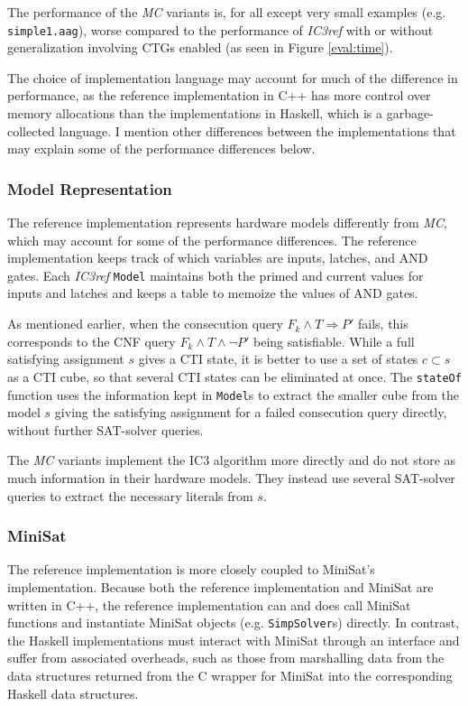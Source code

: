 \documentclass[12pt,a4paper,twoside,openright]{report}
\begin{document}
{{The performance of the \emph{MC} variants is, for all except very small examples
(e.g. \verb,simple1.aag,),
worse compared to the performance of \emph{IC3ref}
with or without generalization involving CTGs enabled (as seen in Figure \ref{eval:time}).

The choice of implementation language may account for much of the difference in performance, as the reference
implementation in C++ has more control over memory allocations than the implementations in Haskell, which is
a garbage-collected language. I mention other differences between the implementations that may explain
some of the performance differences below.

\subsubsection{Model Representation}
\label{eval:ic3ref:model}
The reference implementation represents hardware models differently from
\emph{MC}, which may account for some of the performance differences.
The reference implementation keeps track of which variables are inputs, latches, and AND gates.
Each \emph{IC3ref} \verb,Model, maintains both the primed and current values for inputs and latches and keeps a
table to memoize the values of AND gates.

As mentioned earlier, when the consecution query $F_k \wedge T \Rightarrow P'$ fails, this corresponds
to the CNF query $F_k \wedge T \wedge \neg P'$ being satisfiable.
While a full satisfying assignment
$s$ gives a CTI state, it is better to use a set of states $c \subset s$ as a CTI cube, so that several
CTI states can be eliminated at once.
The \verb,stateOf, function uses the information kept in \verb,Model,s to extract the smaller
cube from the model $s$ giving the satisfying assignment for a failed consecution query directly,
without further SAT-solver queries.

The \emph{MC} variants implement the IC3 algorithm more directly and do not store as
much information in their hardware
models. They instead use several SAT-solver queries to extract the necessary literals
from $s$.

\subsubsection{MiniSat}
\label{eval:ic3ref:minisat}
The reference implementation is more closely coupled to MiniSat's implementation. Because both the reference
implementation and MiniSat are written in C++, the reference implementation can and does call MiniSat functions
and instantiate MiniSat objects (e.g. \verb,SimpSolver,s) directly.
In contrast, the Haskell implementations
must interact with MiniSat through an interface and suffer from associated overheads, such as those from
marshalling data from the data structures returned from the C wrapper for MiniSat into the corresponding
Haskell data structures.

}}
\end{document}
